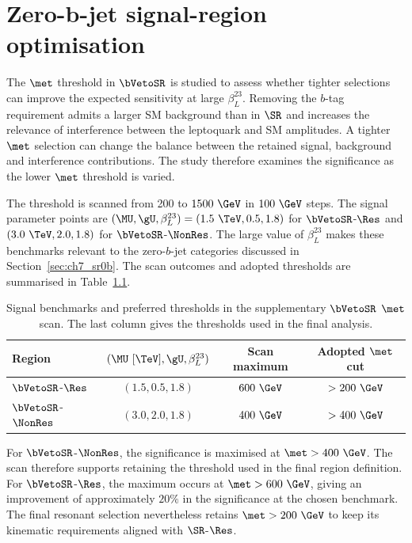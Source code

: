 \chapter{Zero-b-jet signal-region optimisation}
\label{app:sr0b_optimisation}

The $\met$ threshold in $\bVetoSR$ is studied to assess whether tighter selections can improve the expected sensitivity at large $\beta_L^{23}$.
Removing the $b$-tag requirement admits a larger SM background than in $\SR$ and increases the relevance of interference between the leptoquark and SM amplitudes.
A tighter $\met$ selection can change the balance between the retained signal, background and interference contributions.
The study therefore examines the significance as the lower $\met$ threshold is varied.

The threshold is scanned from 200 to $1500~\GeV$ in $100~\GeV$ steps.
The signal parameter points are $(\MU,\gU,\beta_L^{23})=(1.5~\TeV,0.5,1.8)$ for $\bVetoSR$-$\Res$ and $(3.0~\TeV,2.0,1.8)$ for $\bVetoSR$-$\NonRes$.
The large value of $\beta_L^{23}$ makes these benchmarks relevant to the zero-$b$-jet categories discussed in Section~\ref{sec:ch7_sr0b}.
The scan outcomes and adopted thresholds are summarised in Table~\ref{tab:app_sr0b_scan}.

\begin{table}[htbp]
    \centering
    \small
    \caption{Signal benchmarks and preferred thresholds in the supplementary $\bVetoSR$ $\met$ scan. The last column gives the thresholds used in the final analysis.}
    \label{tab:app_sr0b_scan}
    \begin{tabular}{lccc}
        \toprule
        Region & $(\MU~[\TeV],\gU,\beta_L^{23})$ & Scan maximum & Adopted $\met$ cut \\
        \midrule
        $\bVetoSR$-$\Res$ & $(1.5,0.5,1.8)$ & $600~\GeV$ & $>200~\GeV$ \\
        $\bVetoSR$-$\NonRes$ & $(3.0,2.0,1.8)$ & $400~\GeV$ & $>400~\GeV$ \\
        \bottomrule
    \end{tabular}
\end{table}

For $\bVetoSR$-$\NonRes$, the significance is maximised at $\met>400~\GeV$.
The scan therefore supports retaining the threshold used in the final region definition.
For $\bVetoSR$-$\Res$, the maximum occurs at $\met>600~\GeV$, giving an improvement of approximately $20\%$ in the significance at the chosen benchmark.
The final resonant selection nevertheless retains $\met>200~\GeV$ to keep its kinematic requirements aligned with $\SR$-$\Res$.
